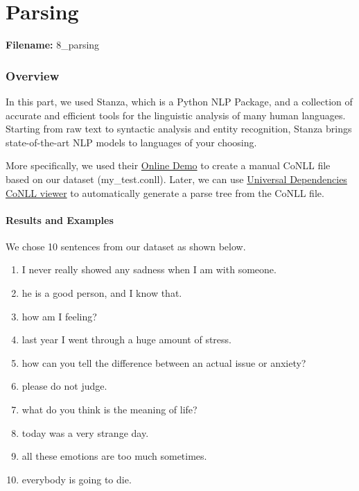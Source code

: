 \documentclass[12pt, a4paper]{article}
\begin{document}
	
	
	\newpage
	\part{Parsing}
	\large{\textbf{Filename:} 8\_parsing}
	\section{Overview}
	In this part, we used Stanza, which is a Python NLP Package, and a collection of accurate and efficient tools for the linguistic analysis of many human languages. Starting from raw text to syntactic analysis and entity recognition, Stanza brings state-of-the-art NLP models to languages of your choosing.
	
	More specifically, we used their \href{http://stanza.run/}{Online Demo} to create a manual CoNLL file based on our dataset (my\_test.conll). Later, we can use \href{https://universaldependencies.org/conllu_viewer.html}{Universal Dependencies CoNLL viewer} to automatically generate a parse tree from the CoNLL file.
	
	\subsection{Results and Examples}
	We chose 10 sentences from our dataset as shown below.
	\begin{enumerate}
		\item I never really showed any sadness when I am with someone.
		\item he is a good person, and I know that.
		\item how am I feeling?
		\item last year I went through a huge amount of stress.
		\item how can you tell the difference between an actual issue or anxiety?
		\item please do not judge.
		\item what do you think is the meaning of life?
		\item today was a very strange day.
		\item all these emotions are too much sometimes. 
		\item everybody is going to die.
	\end{enumerate}
	
\end{document}

